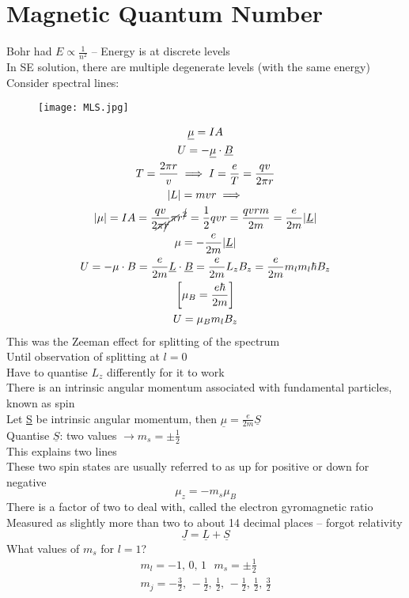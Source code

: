 \documentclass[a4paper, 11pt, fleqn, normalem]{report}
\begin{document}
\section{Magnetic Quantum Number}
Bohr had $E \propto \frac{1}{n^{2}}$ -- Energy is at discrete levels \\
In SE solution, there are multiple degenerate levels (with the same energy) \\
Consider spectral lines:
\begin{figure}[H]
    \texttt{[image: MLS.jpg]}
\end{figure}
\begin{gather*}
    \underline{\mu} = IA \\
    U = -\underline{\mu}\cdot\underline{B} \\
    T = \frac{2\pi r}{v} \implies I = \frac{e}{T} = \frac{qv}{2\pi r} \\
    |L| = mvr \implies \\
    |\mu| = IA = \frac{qv}{2\cancel{\pi}\cancel{r}}\cancel{\pi}r^{\cancel{2}} = \frac{1}{2}qvr = \frac{qvrm}{2m} = \frac{e}{2m}|\underline{L}| \\
    \mu = -\frac{e}{2m}|\underline{L}| \\
    U = -\mu \cdot B = \frac{e}{2m}\underline{L} \cdot \underline{B} = \frac{e}{2m}L_{z}B_{z} = \frac{e}{2m}m_{l}m_{l}\hbar B_{z} \\
    \bigg[\mu_{B} = \frac{e\hbar}{2m}\bigg] \\
    U = \mu_{B}m_{l}B_{z}
\end{gather*}
This was the Zeeman effect for splitting of the spectrum \\
Until observation of splitting at $l = 0$ \\
Have to quantise $L_{z}$ differently for it to work \\
There is an intrinsic angular momentum associated with fundamental particles, known as spin \\
Let \underline{S} be intrinsic angular momentum, then $\underline{\mu} = \frac{e}{2m}\underline{S}$ \\
Quantise $\underline{S}$: two values $\rightarrow m_{s} = \pm \frac{1}{2}$ \\
This explains two lines \\
These two spin states are usually referred to as up for positive or down for negative
\begin{equation*}
    \mu_{z} = -m_{s}\mu_{B}
\end{equation*}
There is a factor of two to deal with, called the electron gyromagnetic ratio \\
Measured as slightly more than two to about 14 decimal places -- forgot relativity
\begin{equation*}
    \underline{J} = \underline{L} + \underline{S}
\end{equation*}
What values of $m_{s}$ for $l = 1$?
\begin{gather*}
    m_{l} = -1,\,0,\,1 ~~~ m_{s} = \pm \frac{1}{2} \\
    m_{j} = -\frac{3}{2},\,-\frac{1}{2},\,\frac{1}{2},\,-\frac{1}{2},\,\frac{1}{2},\,\frac{3}{2}
\end{gather*}
\end{document}
